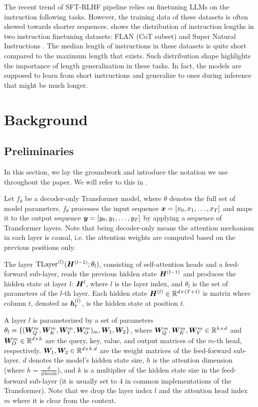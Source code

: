\documentclass{article}
\begin{document}
The recent trend of SFT-RLHF pipeline \citep{Ouyang2022:InstructGPT} relies on finetuning LLMs on the instruction following tasks. However, the training data of these datasets is often skewed towards shorter sequences.  shows the distribution of instruction lengths in two instruction finetuning datasets: FLAN (CoT subset) \citep{Longpre2023:FLAN} and Super Natural Instructions \citep{Wang2022:SuperNaturalInstructions}. The median length of instructions in these datasets is quite short compared to the maximum length that exists. Such distribution shape highlights the importance of length generalization in these tasks. In fact, the models are supposed to learn from short instructions and generalize to ones during inference that might be much longer.

\section{Background}
\label{sec:pe-background}

\subsection{Preliminaries}
\label{sec:preliminaries}
In this section, we lay the groundwork and introduce the notation we use throughout the paper. We will refer to this in .

Let $f_\theta$ be a decoder-only Transformer model, where $\theta$ denotes the
full set of model parameters.
$f_\theta$ processes the input sequence ${\bm{x}} = \left[x_0, x_1, \ldots, x_T\right]$
and maps it to the output sequence ${\bm{y}} = \left[y_0, y_1, \ldots, y_T\right]$ by applying a sequence of Transformer layers. Note that being decoder-only means the attention mechanism in each layer is causal, i.e. the attention weights are computed based on the previous positions only.

The layer $\mathrm{TLayer}^{(l)}({\bm{H}}^{(l-1)};\theta_l)$, consisting of self-attention heads and a feed-forward sub-layer, reads the previous hidden state ${\bm{H}}^{(l-1)}$ and produces the hidden state at layer $l$: ${\bm{H}}^{l}$, where $l$ is the layer index, and $\theta_l$ is the set of parameters of the $l$-th layer.
Each hidden state ${\bm{H}}^{(l)} \in \mathbb{R}^{d \times (T+1)}$ is matrix where column $t$, denoted as ${\bm{h}}_t^{(l)}$, is the hidden state at position $t$.

A layer $l$ is parameterized by a set of parameters $\theta_l = \{({\bm{W}}_Q^m, {\bm{W}}_K^m, {\bm{W}}_V^m, {\bm{W}}_O^m)_m, {\bm{W}}_1, {\bm{W}}_2\}$, where ${\bm{W}}_Q^m, {\bm{W}}_K^m, {\bm{W}}_V^m \in \mathbb{R}^{h \times d}$ and ${\bm{W}}_O^m \in \mathbb{R}^{d \times h}$ are the query, key, value, and output matrices of the $m$-th head, respectively. ${\bm{W}}_1, {\bm{W}}_2 \in \mathbb{R}^{d \times k.d}$ are the weight matrices of the feed-forward sub-layer. $d$ denotes the model's hidden state size, $h$ is the attention dimension (where $h = \frac{d}{\text{\# heads}}$), and $k$ is a multiplier of the hidden state size in the feed-forward sub-layer (it is usually set to 4 in common implementations of the Transformer). Note that we drop the layer index $l$ and the attention head index $m$ where it is clear from the context.
\end{document}
